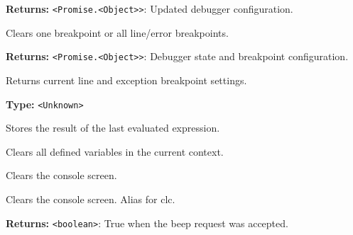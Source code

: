 \documentclass[12pt,a4paper]{article}
\begin{document}
\noindent \textbf{Returns:} \texttt{<Promise.<Object>>}: Updated debugger configuration.

\noindent Clears one breakpoint or all line/error breakpoints.

\vspace{5mm}
\noindent {}


\noindent \textbf{Returns:} \texttt{<Promise.<Object>>}: Debugger state and breakpoint configuration.

\noindent Returns current line and exception breakpoint settings.

\vspace{5mm}
\noindent {}\vspace{4mm}


\noindent \textbf{Type:} \texttt{<Unknown>}

\noindent Stores the result of the last evaluated expression.

\vspace{5mm}
\noindent {}


\noindent Clears all defined variables in the current context.

\vspace{5mm}
\noindent {}


\noindent Clears the console screen.

\vspace{5mm}
\noindent {}


\noindent Clears the console screen. Alias for \textasciigrave{}clc\textasciigrave{}.

\vspace{5mm}
\noindent {}


\noindent \textbf{Returns:} \texttt{<boolean>}: True when the beep request was accepted.
\end{document}
